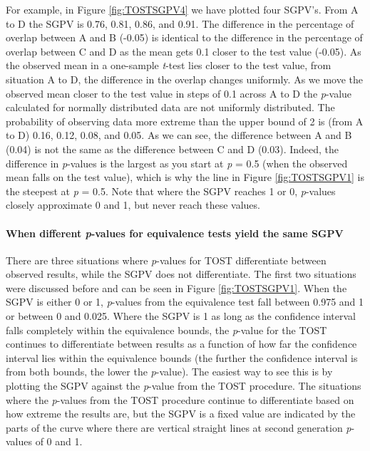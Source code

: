 \documentclass[
  english,
  man]{apa6}
\let\oldparagraph\paragraph
\renewcommand{\paragraph}[1]{\oldparagraph{#1}\mbox{}}
\begin{document}
For example, in Figure \ref{fig:TOSTSGPV4} we have plotted four SGPV's. From A to D the SGPV is 0.76, 0.81, 0.86, and 0.91. The difference in the percentage of overlap between A and B (-0.05) is identical to the difference in the percentage of overlap between C and D as the mean gets 0.1 closer to the test value (-0.05).
As the observed mean in a one-sample \emph{t}-test lies closer to the test value, from situation A to D, the difference in the overlap changes uniformly.
As we move the observed mean closer to the test value in steps of 0.1 across A to D the \emph{p}-value calculated for normally distributed data are not uniformly distributed. The probability of observing data more extreme than the upper bound of 2 is (from A to D) 0.16, 0.12, 0.08, and 0.05. As we can see, the difference between A and B (0.04) is not the same as the difference between C and D (0.03). Indeed, the difference in \emph{p}-values is the largest as you start at \emph{p} = 0.5 (when the observed mean falls on the test value), which is why the line in Figure \ref{fig:TOSTSGPV1} is the steepest at \emph{p} = 0.5. Note that where the SGPV reaches 1 or 0, \emph{p}-values closely approximate 0 and 1, but never reach these values.

\hypertarget{when-different-p-values-for-equivalence-tests-yield-the-same-sgpv}{%
\paragraph{\texorpdfstring{When different \emph{p}-values for equivalence tests yield the same SGPV}{When different p-values for equivalence tests yield the same SGPV}}\label{when-different-p-values-for-equivalence-tests-yield-the-same-sgpv}}

There are three situations where \emph{p}-values for TOST differentiate between observed results, while the SGPV does not differentiate. The first two situations were discussed before and can be seen in Figure \ref{fig:TOSTSGPV1}. When the SGPV is either 0 or 1, \emph{p}-values from the equivalence test fall between 0.975 and 1 or between 0 and 0.025. Where the SGPV is 1 as long as the confidence interval falls completely within the equivalence bounds, the \emph{p}-value for the TOST continues to differentiate between results as a function of how far the confidence interval lies within the equivalence bounds (the further the confidence interval is from both bounds, the lower the \emph{p}-value). The easiest way to see this is by plotting the SGPV against the \emph{p}-value from the TOST procedure. The situations where the \emph{p}-values from the TOST procedure continue to differentiate based on how extreme the results are, but the SGPV is a fixed value are indicated by the parts of the curve where there are vertical straight lines at second generation \emph{p}-values of 0 and 1.
\end{document}
